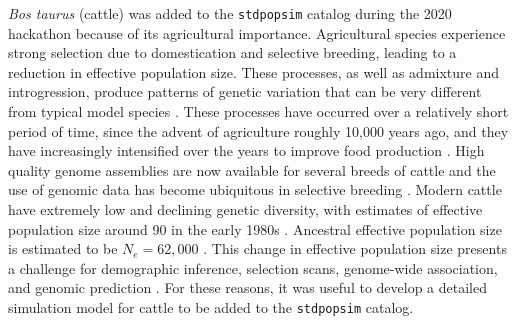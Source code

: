 \documentclass[hidelinks]{article}
\newcommand{\stdpopsim}{\texttt{stdpopsim}\xspace}
\begin{document}
\emph{Bos taurus} (cattle) was added to the \stdpopsim catalog during the 2020 hackathon because of its agricultural importance. Agricultural species experience
strong selection due to domestication and selective breeding, leading
to a reduction in effective population size. These processes,
as well as admixture and introgression, produce patterns
of genetic variation that can be very different from typical model
species \citep{Larson2013}. These processes have occurred over a
relatively short period of time, since the advent of agriculture roughly 10,000 years ago, and they have increasingly intensified over the years to improve food production \citep{Gaut2018,MacLeod2013}. High quality genome assemblies are now
available for several breeds of cattle \citep[e.g.,][]{Rosen2020, Heaton2021,
Talenti2022} and the use of genomic data has become ubiquitous
in selective breeding \citep{Meuwissen2001,MacLeod2014, Obsteter2021, Cesarani2022}.
Modern cattle have extremely low and declining genetic diversity,
with estimates of effective population size around 90 in the early 1980s \citep{MacLeod2013, VanRaden2020, Makanjouloa2020}.
Ancestral effective population size is estimated to be $N_e=62,000$ \citep{MacLeod2013}.
This change in effective population size presents a challenge for demographic inference, 
selection scans, genome-wide association, and genomic prediction
\citep{MacLeod2013,MacLeod2014,Hartfield2022}. 
For these reasons, it was useful to develop a detailed simulation model for cattle to be added to the \stdpopsim catalog.
\end{document}
